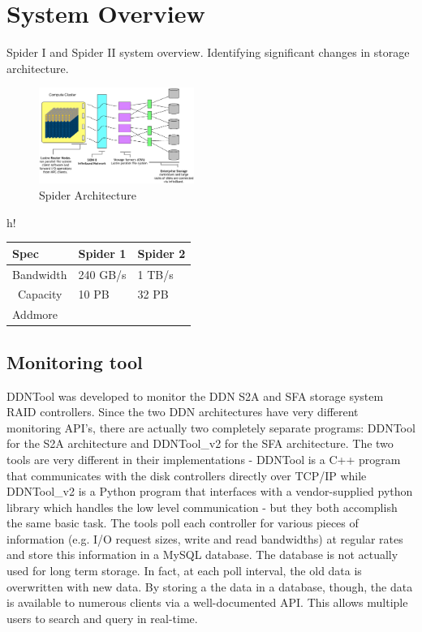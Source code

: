 \section{System Overview}
\label{sec:overview}

Spider I and Spider II system overview. Identifying significant changes in storage architecture.

\begin{figure}[!t]
\centering
\includegraphics[width=0.45\textwidth]{./figs/spider2arch.ps}
\vspace{-0.1in}
\centering
\caption{Spider Architecture}
\label{fig:arch}
\end{figure}

\begin{table}{h!}
\begin{center}
\begin{tabular}{l||l|l}
 Spec & Spider 1 & Spider 2\\
\hline
Bandwidth & 240 GB/s & 1 TB/s \\
\
Capacity & 10 PB & 32 PB \\
Addmore \\
\end{tabular}
\end{center}
\end{table}


\subsection{Monitoring tool}
DDNTool \cite{ddntool10:ross} was developed to monitor the DDN S2A and SFA storage system RAID controllers. Since the two DDN architectures have very different monitoring API's, there are actually two completely separate programs:  DDNTool for the S2A architecture and DDNTool\_v2 for the SFA architecture.  The two tools are very different in their implementations - DDNTool is a C++ program that communicates with the disk controllers directly over TCP/IP while DDNTool\_v2 is a Python program that interfaces with a vendor-supplied python library which handles the low level communication - but they both accomplish the same basic task.  The tools poll each controller for various pieces of information (e.g. I/O request sizes, write and read bandwidths) at regular rates and store this information in a MySQL database.  The database is not actually used for long term storage.  In fact, at each poll interval, the old data is overwritten with new data.  By storing a the data in a database, though, the data is available to numerous clients via a well-documented API.  This allows multiple users to search and query in real-time.

